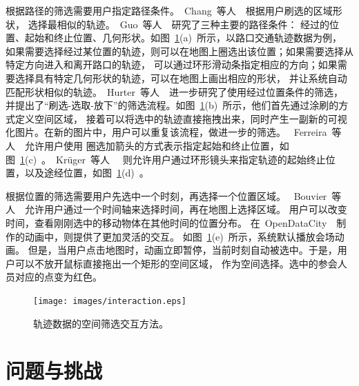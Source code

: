 \documentclass[12pt,twocolumn]{article}
\begin{document}
根据路径的筛选需要用户指定路径条件。~Chang~等人~\citep{ChangHN2012}~根据用户刷选的区域形状，
选择最相似的轨迹。~Guo~等人~\citep{GuoWYZY2011}~研究了三种主要的路径条件：
经过的位置、起始和终止位置、几何形状。如图~\ref{fig:interaction}(a)~所示，以路口交通轨迹数据为例，
如果需要选择经过某位置的轨迹，则可以在地图上圈选出该位置；如果需要选择从特定方向进入和离开路口的轨迹，
可以通过环形滑动条指定相应的方向；如果需要选择具有特定几何形状的轨迹，可以在地图上画出相应的形状，
并让系统自动匹配形状相似的轨迹。~Hurter~等人~\citep{HurterTC2009}~进一步研究了使用经过位置条件的筛选，
并提出了“刷选-选取-放下”的筛选流程。如图~\ref{fig:interaction}(b)~所示，他们首先通过涂刷的方式定义空间区域，
接着可以将选中的轨迹直接拖拽出来，同时产生一副新的可视化图片。在新的图片中，用户可以重复该流程，做进一步的筛选。
~Ferreira~等人~\citep{FerreiraPVFS2013}~允许用户使用
圈选加箭头的方式表示指定起始和终止位置，如图~\ref{fig:interaction}(c)~。~Krüger~等人~\citep{KruegerTWBE2013}~
则允许用户通过环形镜头来指定轨迹的起始终止位置，以及途经位置，如图~\ref{fig:interaction}(d)~。

根据位置的筛选需要用户先选中一个时刻，再选择一个位置区域。
~Bouvier~等人~\citep{BouvierO2008}~允许用户通过一个时间轴来选择时间，再在地图上选择区域。
用户可以改变时间，查看刚刚选中的移动物体在其他时间的位置分布。
在~OpenDataCity~\citep{OpenDataCity2013}~制作的动画中，则提供了更加灵活的交互。
如图~\ref{fig:interaction}(e)~所示，系统默认播放会场动画。
但是，当用户点击地图时，动画立即暂停，当前时刻自动被选中。于是，用户可以不放开鼠标直接拖出一个矩形的空间区域，
作为空间选择。选中的参会人员对应的点变为红色。

\begin{figure}[!htb]
\centering
\texttt{[image: images/interaction.eps]}
\caption{\label{fig:interaction}轨迹数据的空间筛选交互方法。
}
\end{figure}

\section{问题与挑战}
\label{section:challenge}
\end{document}
